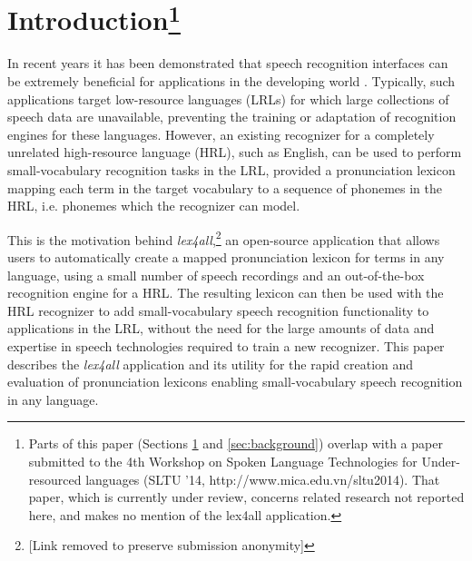 \documentclass[11pt]{article}
\begin{document}
\section{Introduction\footnote{Parts of this paper (Sections \ref{sec:intro} and \ref{sec:background}) overlap with a paper submitted to the 4th Workshop on Spoken Language Technologies for Under-resourced languages (SLTU '14, http://www.mica.edu.vn/sltu2014). That paper, which is currently under review, concerns related research not reported here, and makes no mention of the lex4all application.}}
\label{sec:intro}

In recent years it has been demonstrated that speech recognition interfaces can be extremely beneficial for applications in the developing world
 \cite{case4st4d,Sherwani09,bali13}. 
Typically, 
such applications target low-resource languages (LRLs) for which large collections of speech data are unavailable, preventing the training or adaptation of recognition engines for these languages.
However, 
an existing recognizer for a completely unrelated high-resource language (HRL), such as English, can be used to perform small-vocabulary recognition tasks in the LRL,
provided a pronunciation lexicon mapping each term in the target vocabulary to a sequence of phonemes in the HRL, i.e. phonemes which the recognizer can model. 

This is the motivation behind \textit{lex4all},\footnote{[Link removed to preserve submission anonymity]} an open-source application that allows users to automatically create a mapped pronunciation lexicon for terms in any language, using a small number of speech recordings and an out-of-the-box recognition engine for a HRL. The resulting lexicon can then be used with the HRL recognizer to add small-vocabulary speech recognition functionality to applications in the LRL, without the need for the large amounts of data and expertise in speech technologies required to train a new recognizer. This paper describes the \textit{lex4all} application and its utility for the rapid
creation and evaluation of pronunciation lexicons enabling small-vocabulary speech recognition in any language.
\end{document}

